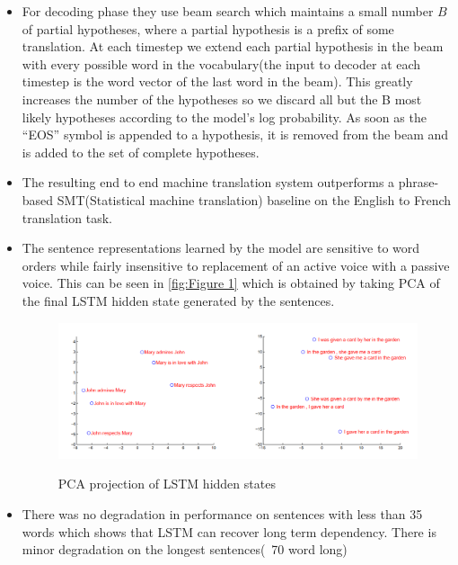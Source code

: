 \documentclass{article}
\begin{document}
\begin{itemize}
    \item For decoding phase they use beam search which maintains a small number $B$ of partial hypotheses, where a partial hypothesis is a prefix of some translation. At each timestep we extend each partial hypothesis in the beam with every possible word in the vocabulary(the input to decoder at each timestep is the word vector of the last word in the beam). This greatly increases the number of the hypotheses so we discard all but the B most likely hypotheses according to the model’s log probability. As soon as the “EOS” symbol is appended to a hypothesis, it is removed from the beam and is added to the set of complete hypotheses. 
    \item The resulting end to end machine translation system outperforms a phrase-based SMT(Statistical machine translation) baseline on the English to French translation task.
    \item The sentence representations learned by the model are sensitive to word orders while fairly insensitive to replacement of an active voice with a passive voice. This can be seen in \autoref{fig:Figure 1} which is obtained by taking PCA of the final LSTM hidden state generated by the sentences.
    \begin{figure}[t!]
        \centering
        \caption{PCA projection of LSTM hidden states}
        \includegraphics[scale=0.55]{model_analysis.png}
        \label{fig:Figure 1}
    \end{figure}
    \item There was no degradation in performance on sentences with less than 35 words which shows that LSTM can recover long term dependency. There is minor degradation on the longest sentences(~70 word long)
\end{itemize}
\end{document}
